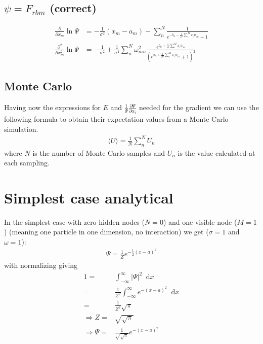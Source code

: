 \documentclass[norsk,a4paper,11pt]{article}
\newcommand*\diff{\mathop{}\!\mathrm{d}}
\begin{document}
\color{Blue}
\subsection{$\psi = F_{rbm}$ (correct)}
\color{Black}
\begin{align}
	\frac{\partial}{\partial x_m} \ln\Psi
	&= - \frac{1}{\sigma^2}(x_m - a_m) - \sum_n^N \frac{1}{e^{-b_n - \frac{1}{\sigma^2}\sum_i^M x_i w_{in}} + 1} \\
	\frac{\partial^2}{\partial x_m^2} \ln\Psi
	&= - \frac{1}{\sigma^2} + \frac{1}{\sigma^4}\sum_n^N \omega_{mn}^2 \frac{e^{b_n + \frac{1}{\sigma^2}\sum_i^M x_i w_{in}}}{(e^{b_n + \frac{1}{\sigma^2}\sum_i^M x_i w_{in}} + 1)^2}
\end{align}

\subsection{Monte Carlo}
Having now the expressions for $E$ and $\frac{1}{\Psi} \frac{\partial\Psi}{\partial \alpha_i}$ needed for the gradient we can use the following formula to obtain their expectation values from a Monte Carlo simulation.
\begin{align}
	\langle U \rangle = \frac{1}{N}\sum_n^N U_n
\end{align}
where $N$ is the number of Monte Carlo samples and $U_n$ is the value calculated at each sampling.



\section{Simplest case analytical}
In the simplest case with zero hidden nodes ($N=0$) and one visible node ($M=1$) (meaning one particle in one dimension, no interaction) we get ($\sigma = 1$ and $\omega=1$):
\begin{align}
	\Psi = \frac{1}{Z} e^{-\frac{1}{2}(x-a)^2}
\end{align}
with normalizing giving
\begin{align}
	1=&\int_{-\infty}^\infty |\Psi|^2 \diff x \\
	=&\frac{1}{Z^2} \int_{-\infty}^\infty e^{-(x-a)^2} \diff x \\
	=&\frac{1}{Z^2} \sqrt{\pi} \\
\Rightarrow	Z =& \sqrt{\sqrt{\pi}} \\
\Rightarrow	\Psi =& \frac{1}{\sqrt{\sqrt{\pi}}} e^{-(x-a)^2}
\end{align}
\end{document}

